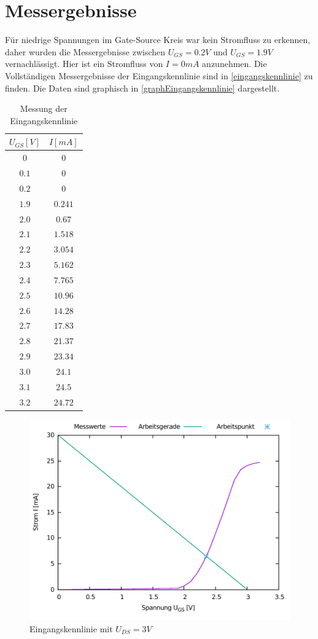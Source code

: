\documentclass[11pt, a4paper]{article}
\begin{document}
\section*{Messergebnisse}
Für niedrige Spannungen im Gate-Source Kreis war kein Stromfluss zu erkennen, daher wurden die Messergebnisse zwischen $U_{GS} = 0.2 V$ und $U_{GS} = 1.9 V$
vernachlässigt. Hier ist ein Stromfluss von $I = 0 mA$ anzunehmen. Die Vollständigen Messergebnisse der Eingangskennlinie sind in \autoref{eingangskennlinie} zu finden. Die Daten sind graphisch in \autoref{graphEingangskennlinie} dargestellt.
\begin{table}[h]
\centering
\begin{tabular}{c|c}
$U_{GS} [V]$ & $I [mA]$ \\ \hline
$0$ 	& $0$ \\
$0.1$ 	& $0$ \\
$0.2$ 	& $0$ \\
$1.9$	& $0.241$ \\
$2.0$	& $0.67$ \\
$2.1$	& $1.518$ \\
$2.2$	& $3.054$ \\
$2.3$	& $5.162$ \\
$2.4$	& $7.765$ \\
$2.5$	& $10.96$ \\
$2.6$	& $14.28$ \\
$2.7$	& $17.83$ \\
$2.8$	& $21.37$ \\
$2.9$	& $23.34$ \\
$3.0$	& $24.1$ \\
$3.1$	& $24.5$ \\
$3.2$	& $24.72$
\end{tabular}
\caption{Messung der Eingangskennlinie}
\label{eingangskennlinie}
\end{table}
\begin{figure}[H]
    \centering
    \includegraphics[width=\linewidth]{eingang.pdf}
    \caption{Eingangskennlinie mit $U_{DS}=3V$}
    \label{graphEingangskennlinie}
\end{figure}
\end{document}
